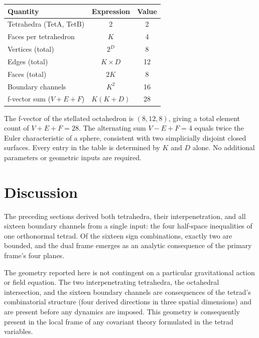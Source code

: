 \documentclass[twocolumn]{iopjournal}
\begin{document}
\vspace{6pt}
\noindent
\begin{tabular*}{\columnwidth}{@{\extracolsep{\fill}}lcc@{}}
\hline
Quantity & Expression & Value \\
\hline
Tetrahedra (TetA, TetB) & $2$ & 2 \\
Faces per tetrahedron & $K$ & 4 \\
Vertices (total) & $2^D$ & 8 \\
Edges (total) & $K \times D$ & 12 \\
Faces (total) & $2K$ & 8 \\
Boundary channels & $K^2$ & 16 \\
f-vector sum ($V\!+\!E\!+\!F$) & $K(K\!+\!D)$ & 28 \\
\hline
\end{tabular*}
\vspace{6pt}

\noindent
The f-vector of the stellated octahedron is $(8, 12, 8)$, giving a total element count of $V + E + F = 28$. The alternating sum $V - E + F = 4$ equals twice the Euler characteristic of a sphere, consistent with two simplicially disjoint closed surfaces. Every entry in the table is determined by $K$ and $D$ alone. No additional parameters or geometric inputs are required.


\section*{Discussion}

The preceding sections derived both tetrahedra, their interpenetration, and all sixteen boundary channels from a single input: the four half-space inequalities of one orthonormal tetrad. Of the sixteen sign combinations, exactly two are bounded, and the dual frame emerges as an analytic consequence of the primary frame's four planes.

The geometry reported here is not contingent on a particular gravitational action or field equation. The two interpenetrating tetrahedra, the octahedral intersection, and the sixteen boundary channels are consequences of the tetrad's combinatorial structure (four derived directions in three spatial dimensions) and are present before any dynamics are imposed. This geometry is consequently present in the local frame of any covariant theory formulated in the tetrad variables.
\end{document}
